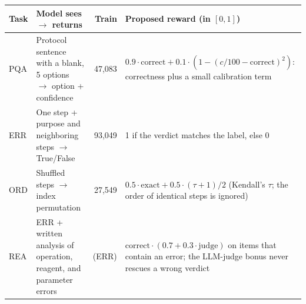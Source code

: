\documentclass[10pt]{article}
\begin{document}
\vspace{-2pt}\begin{center}\small
\begin{tabular}{@{}lp{4.3cm}rp{6.4cm}@{}}
\toprule
Task & Model sees $\rightarrow$ returns & Train & Proposed reward (in $[0,1]$) \\
\midrule
PQA & Protocol sentence with a blank, 5 options $\rightarrow$ option + confidence & 47,083 &
  $0.9\cdot\mathrm{correct} + 0.1\cdot(1-(c/100-\mathrm{correct})^2)$: correctness plus
  a small calibration term \\
ERR & One step + purpose and neighboring steps $\rightarrow$ True/False & 93,049 &
  1 if the verdict matches the label, else 0 \\
ORD & Shuffled steps $\rightarrow$ index permutation & 27,549 &
  $0.5\cdot\mathrm{exact} + 0.5\cdot(\tau+1)/2$ (Kendall's $\tau$; the order of identical
  steps is ignored) \\
REA & ERR + written analysis of operation, reagent, and parameter errors & (ERR) &
  $\mathrm{correct}\cdot(0.7+0.3\cdot\mathrm{judge})$ on items that contain an error;
  the LLM-judge bonus never rescues a wrong verdict \\
\bottomrule
\end{tabular}
\end{center}\vspace{-6pt}
\end{document}
